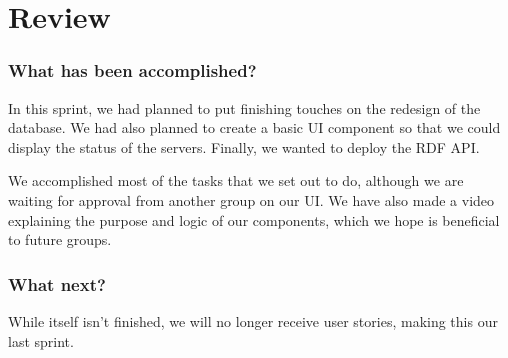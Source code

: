 \section{Review}\label{sec:sprint6review}

\subsubsection*{What has been accomplished?}
In this sprint, we had planned to put finishing touches on the redesign of the database. We had also planned to create a basic UI component so that we could display the status of the servers. Finally, we wanted to deploy the RDF API.

We accomplished most of the tasks that we set out to do, although we are waiting for approval from another group on our UI. We have also made a video explaining the purpose and logic of our components, which we hope is beneficial to future \knox{} groups.

\subsubsection*{What next?}
While \knox{} itself isn't finished, we will no longer receive user stories, making this our last sprint. 